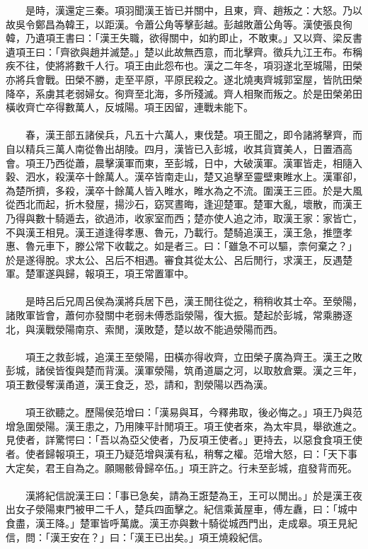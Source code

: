 　　是時，漢還定三秦。項羽聞漢王皆已并關中，且東，齊、趙叛之：大怒。乃以故吳令鄭昌為韓王，以距漢。令蕭公角等擊彭越。彭越敗蕭公角等。漢使張良徇韓，乃遺項王書曰：「漢王失職，欲得關中，如約即止，不敢東。」又以齊、梁反書遺項王曰：「齊欲與趙并滅楚。」楚以此故無西意，而北擊齊。徵兵九江王布。布稱疾不往，使將將數千人行。項王由此怨布也。漢之二年冬，項羽遂北至城陽，田榮亦將兵會戰。田榮不勝，走至平原，平原民殺之。遂北燒夷齊城郭室屋，皆阬田榮降卒，系虜其老弱婦女。徇齊至北海，多所殘滅。齊人相聚而叛之。於是田榮弟田橫收齊亡卒得數萬人，反城陽。項王因留，連戰未能下。
\\\\
　　春，漢王部五諸侯兵，凡五十六萬人，東伐楚。項王聞之，即令諸將擊齊，而自以精兵三萬人南從魯出胡陵。四月，漢皆已入彭城，收其貨寶美人，日置酒高會。項王乃西從蕭，晨擊漢軍而東，至彭城，日中，大破漢軍。漢軍皆走，相隨入穀、泗水，殺漢卒十餘萬人。漢卒皆南走山，楚又追擊至靈壁東睢水上。漢軍卻，為楚所擠，多殺，漢卒十餘萬人皆入睢水，睢水為之不流。圍漢王三匝。於是大風從西北而起，折木發屋，揚沙石，窈冥晝晦，逢迎楚軍。楚軍大亂，壞散，而漢王乃得與數十騎遁去，欲過沛，收家室而西；楚亦使人追之沛，取漢王家：家皆亡，不與漢王相見。漢王道逢得孝惠、魯元，乃載行。楚騎追漢王，漢王急，推墮孝惠、魯元車下，滕公常下收載之。如是者三。曰：「雖急不可以驅，柰何棄之？」於是遂得脫。求太公、呂后不相遇。審食其從太公、呂后閒行，求漢王，反遇楚軍。楚軍遂與歸，報項王，項王常置軍中。
\\\\
　　是時呂后兄周呂侯為漢將兵居下邑，漢王閒往從之，稍稍收其士卒。至滎陽，諸敗軍皆會，蕭何亦發關中老弱未傅悉詣滎陽，復大振。楚起於彭城，常乘勝逐北，與漢戰滎陽南京、索閒，漢敗楚，楚以故不能過滎陽而西。
\\\\
　　項王之救彭城，追漢王至滎陽，田橫亦得收齊，立田榮子廣為齊王。漢王之敗彭城，諸侯皆復與楚而背漢。漢軍滎陽，筑甬道屬之河，以取敖倉粟。漢之三年，項王數侵奪漢甬道，漢王食乏，恐，請和，割滎陽以西為漢。
\\\\
　　項王欲聽之。歷陽侯范增曰：「漢易與耳，今釋弗取，後必悔之。」項王乃與范增急圍滎陽。漢王患之，乃用陳平計閒項王。項王使者來，為太牢具，舉欲進之。見使者，詳驚愕曰：「吾以為亞父使者，乃反項王使者。」更持去，以惡食食項王使者。使者歸報項王，項王乃疑范增與漢有私，稍奪之權。范增大怒，曰：「天下事大定矣，君王自為之。願賜骸骨歸卒伍。」項王許之。行未至彭城，疽發背而死。
\\\\
　　漢將紀信說漢王曰：「事已急矣，請為王誑楚為王，王可以閒出。」於是漢王夜出女子滎陽東門被甲二千人，楚兵四面擊之。紀信乘黃屋車，傅左纛，曰：「城中食盡，漢王降。」楚軍皆呼萬歲。漢王亦與數十騎從城西門出，走成皋。項王見紀信，問：「漢王安在？」曰：「漢王已出矣。」項王燒殺紀信。
